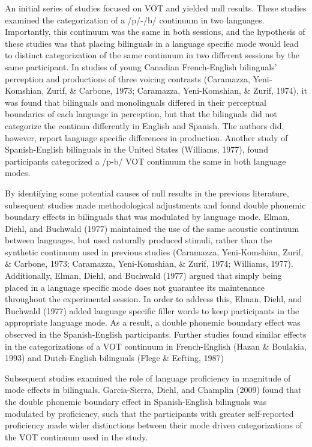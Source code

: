 \documentclass[
  english,
  man]{apa6}
\begin{document}
An initial series of studies focused on VOT and yielded null results. These studies examined the categorization of a /p/-/b/ continuum in two languages. Importantly, this continuum was the same in both sessions, and the hypothesis of these studies was that placing bilinguals in a language specific mode would lead to distinct categorization of the same continuum in two different sessions by the same participant. In studies of young Canadian French-English bilinguals' perception and productions of three voicing contrasts (Caramazza, Yeni‐Komshian, Zurif, \& Carbone, 1973; Caramazza, Yeni-Komshian, \& Zurif, 1974), it was found that bilinguals and monolinguals differed in their perceptual boundaries of each language in perception, but that the bilinguals did not categorize the continua differently in English and Spanish. The authors did, however, report language specific differences in production. Another study of Spanish-English bilinguals in the United States (Williams, 1977), found participants categorized a /p-b/ VOT continuum the same in both language modes.

By identifying some potential causes of null results in the previous literature, subsequent studies made methodological adjustments and found double phonemic boundary effects in bilinguals that was modulated by language mode.
Elman, Diehl, and Buchwald (1977) maintained the use of the same acoustic continuum between languages, but used naturally produced stimuli, rather than the synthetic continuum used in previous studies (Caramazza, Yeni‐Komshian, Zurif, \& Carbone, 1973; Caramazza, Yeni-Komshian, \& Zurif, 1974; Williams, 1977).
Additionally, Elman, Diehl, and Buchwald (1977) argued that simply being placed in a language specific mode does not guarantee its maintenance throughout the experimental session.
In order to address this, Elman, Diehl, and Buchwald (1977) added language specific filler words to keep participants in the appropriate language mode.
As a result, a double phonemic boundary effect was observed in the Spanish-English participants.
Further studies found similar effects in the categorizations of a VOT continuum in French-English (Hazan \& Boulakia, 1993) and Dutch-English bilinguals (Flege \& Eefting, 1987)

Subsequent studies examined the role of language proficiency in magnitude of mode effects in bilinguals.
Garcia-Sierra, Diehl, and Champlin (2009) found that the double phonemic boundary effect in Spanish-English bilinguals was modulated by proficiency, such that the participants with greater self-reported proficiency made wider distinctions between their mode driven categorizations of the VOT continuum used in the study.
\end{document}

